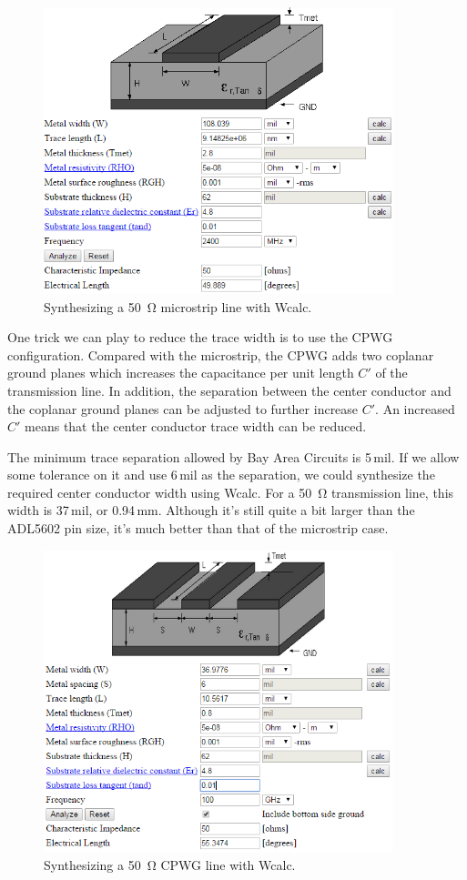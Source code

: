 \documentclass[12pt,letterpaper]{scrartcl}
\begin{document}
	\begin{figure}[h]
		\centering
		\includegraphics[width=4in]{ustrip-synth}
		\caption{Synthesizing a \SI{50}{\ohm} microstrip line with Wcalc.}
		\label{fig:ustrip-synth}
	\end{figure}

One trick we can play to reduce the trace width is to use the CPWG configuration. Compared with the microstrip, the CPWG adds two coplanar ground planes which increases the capacitance per unit length $C'$ of the transmission line. In addition, the separation between the center conductor and the coplanar ground planes can be adjusted to further increase $C'$. An increased $C'$ means that the center conductor trace width can be reduced. 

The minimum trace separation allowed by Bay Area Circuits is 5\,mil. If we allow some tolerance on it and use 6\,mil as the separation, we could synthesize the required center conductor width using Wcalc. For a \SI{50}{\ohm} transmission line, this width is 37\,mil, or 0.94\,mm. Although it's still quite a bit larger than the ADL5602 pin size, it's much better than that of the microstrip case. 

	\begin{figure}[hp]
		\centering
		\includegraphics[width=4in]{cpwg-synth}
		\caption{Synthesizing a \SI{50}{\ohm} CPWG line with Wcalc.}
		\label{fig:cpwg-synth}
	\end{figure}
\end{document}
